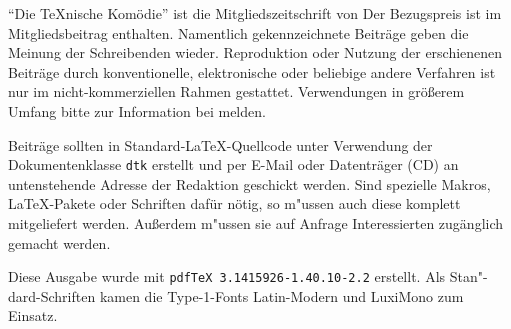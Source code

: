 \begingroup\small
"`Die \TeX{}nische Komödie"' ist die Mitgliedszeitschrift von
\dante{} Der Bezugspreis ist im Mitgliedsbeitrag enthalten.
Namentlich gekennzeichnete Beiträge geben die Meinung der
Schreibenden wieder.  Reproduktion oder Nutzung der erschienenen
Beiträge durch konventionelle, elektronische oder beliebige andere
Verfahren ist nur im nicht-kommerziellen Rahmen gestattet.
Verwendungen in größerem Umfang bitte zur Information bei \dante{}
melden.

Beiträge sollten in Standard-\LaTeX-Quellcode unter Verwendung der
Dokumentenklasse \texttt{dtk} erstellt und per \mbox{E-Mail} oder 
Datenträger (CD) an untenstehende Adresse
der Redaktion geschickt werden.  Sind
spezielle Makros, \LaTeX-Pakete oder Schriften dafür nötig, so
m"ussen auch diese komplett mitgeliefert werden.  Außerdem m"ussen sie auf
Anfrage Interessierten zugänglich gemacht werden.  \smallskip


Diese Ausgabe wurde mit 
\texttt{pdfTeX 3.1415926-1.40.10-2.2} %
erstellt.
Als Stan"-dard-Schriften kamen die Type-1-Fonts Latin-Modern und LuxiMono zum Einsatz.


